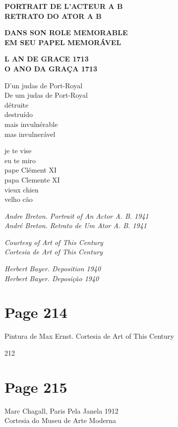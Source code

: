 \documentclass[a4paper]{article}
\begin{document}
\textbf{PORTRAIT DE L'ACTEUR A B} \\
\textbf{RETRATO DO ATOR A B}

\textbf{DANS SON ROLE MEMORABLE} \\
\textbf{EM SEU PAPEL MEMORÁVEL}

\textbf{L AN DE GRACE 1713} \\
\textbf{O ANO DA GRAÇA 1713}

D'un judas de Port-Royal \\
De um judas de Port-Royal \\
détruite \\
destruído \\
mais invulnérable \\
mas invulnerável

je te vise \\
eu te miro \\
pape Clément XI \\
papa Clemente XI \\
vieux chien \\
velho cão

\textit{Andre Breton. Portrait of An Actor A. B. 1941} \\
\textit{André Breton. Retrato de Um Ator A. B. 1941}

\textit{Courtesy of Art of This Century} \\
\textit{Cortesia de Art of This Century}

\textit{Herbert Bayer. Deposition 1940} \\
\textit{Herbert Bayer. Deposição 1940}

\newpage
\section*{Page 214}

Pintura de Max Ernst.
Cortesia de Art of This Century

212

\newpage
\section*{Page 215}

\begin{flushleft}
Marc Chagall, Paris Pela Janela 1912 \\
Cortesia do Museu de Arte Moderna
\end{flushleft}
\vspace*{\fill}

\newpage
\end{document}
